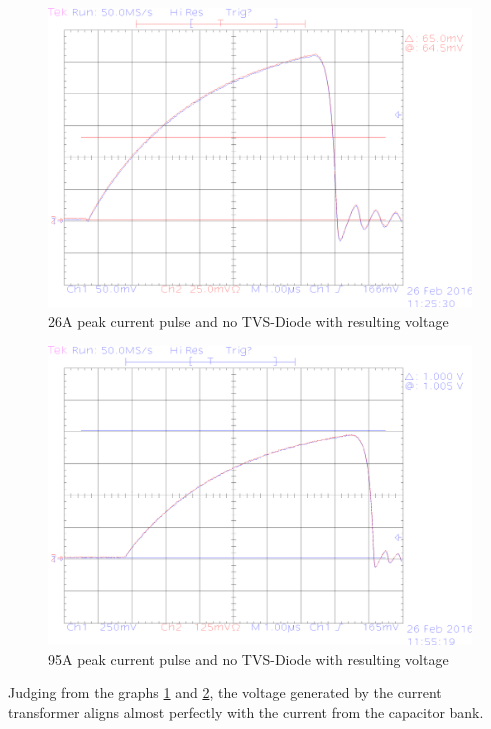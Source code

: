 \begin{figure}[!ht]
	\centering
	\includegraphics[scale=0.3]{figures/Voltage_Clamping/TEK00001.eps}		
	\caption[Kurze Abbildungsbeschreibung]{26A peak current pulse and no TVS-Diode with resulting voltage} 
	\label{fig.26Anodiode}
\end{figure}

\begin{figure}[!ht]
	\centering
	\includegraphics[scale=0.3]{figures/Voltage_Clamping/TEK00004.eps}		
	\caption[Kurze Abbildungsbeschreibung]{95A peak current pulse and no TVS-Diode with resulting voltage} 
	\label{fig.100Anodiode}
\end{figure}

Judging from the graphs \ref{fig.26Anodiode} and \ref{fig.100Anodiode}, the voltage generated by the current transformer aligns almost
perfectly with the current from the capacitor bank.

